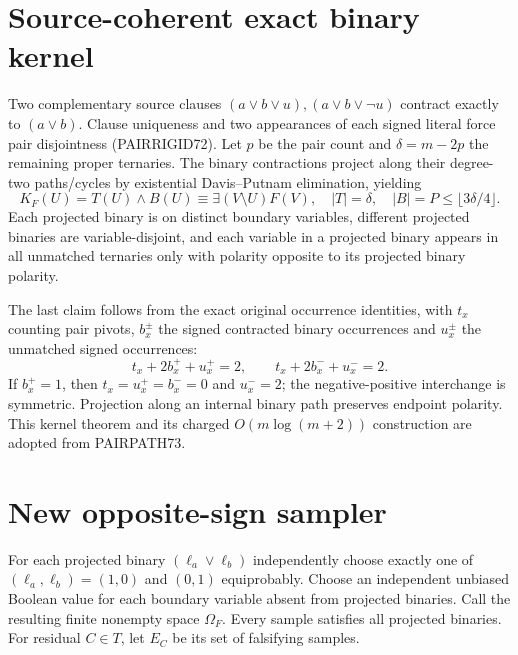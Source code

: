 \documentclass[11pt]{article}
\begin{document}
\section{Source-coherent exact binary kernel}
Two complementary source clauses $(a\vee b\vee u),(a\vee b\vee\neg u)$ contract exactly to $(a\vee b)$. Clause uniqueness and two appearances of each signed literal force pair disjointness (PAIRRIGID72). Let $p$ be the pair count and $\delta=m-2p$ the remaining proper ternaries. The binary contractions project along their degree-two paths/cycles by existential Davis--Putnam elimination, yielding
\[
K_F(U)=T(U)\wedge B(U)\equiv\exists(V\setminus U)F(V),\quad |T|=\delta,\quad |B|=P\le\lfloor3\delta/4\rfloor.
\]
Each projected binary is on distinct boundary variables, different projected binaries are variable-disjoint, and each variable in a projected binary appears in all unmatched ternaries only with polarity opposite to its projected binary polarity.

The last claim follows from the exact original occurrence identities, with $t_x$ counting pair pivots, $b_x^\pm$ the signed contracted binary occurrences and $u_x^\pm$ the unmatched signed occurrences:
\[
t_x+2b_x^++u_x^+=2,\qquad t_x+2b_x^-+u_x^-=2.
\]
If $b_x^+=1$, then $t_x=u_x^+=b_x^-=0$ and $u_x^-=2$; the negative-positive interchange is symmetric. Projection along an internal binary path preserves endpoint polarity. This kernel theorem and its charged $O(m\log(m+2))$ construction are adopted from PAIRPATH73.

\section{New opposite-sign sampler}
For each projected binary $(\ell_a\vee\ell_b)$ independently choose exactly one of $(\ell_a,\ell_b)=(1,0)$ and $(0,1)$ equiprobably. Choose an independent unbiased Boolean value for each boundary variable absent from projected binaries. Call the resulting finite nonempty space $\Omega_F$. Every sample satisfies all projected binaries. For residual $C\in T$, let $E_C$ be its set of falsifying samples.
\end{document}
